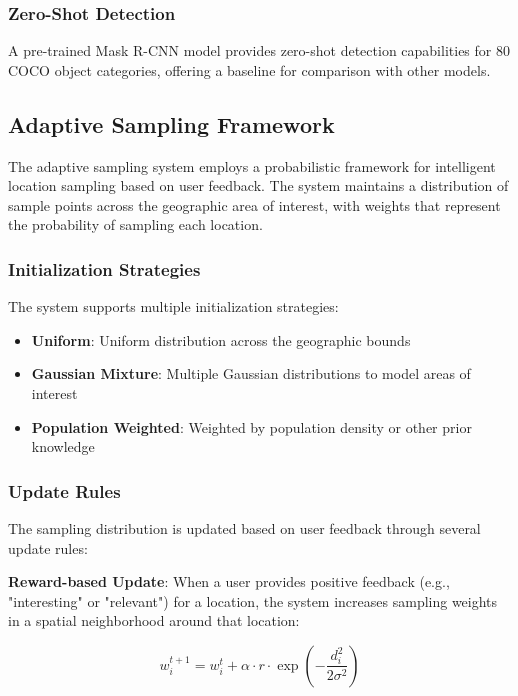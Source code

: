\documentclass[conference]{IEEEtran}
\begin{document}
\subsubsection{Zero-Shot Detection}
A pre-trained Mask R-CNN model provides zero-shot detection capabilities for 80 COCO object categories, offering a baseline for comparison with other models.

\subsection{Adaptive Sampling Framework}

The adaptive sampling system employs a probabilistic framework for intelligent location sampling based on user feedback. The system maintains a distribution of sample points across the geographic area of interest, with weights that represent the probability of sampling each location.

\subsubsection{Initialization Strategies}

The system supports multiple initialization strategies:
\begin{itemize}
    \item \textbf{Uniform}: Uniform distribution across the geographic bounds
    \item \textbf{Gaussian Mixture}: Multiple Gaussian distributions to model areas of interest
    \item \textbf{Population Weighted}: Weighted by population density or other prior knowledge
\end{itemize}

\subsubsection{Update Rules}

The sampling distribution is updated based on user feedback through several update rules:

\textbf{Reward-based Update}: When a user provides positive feedback (e.g., "interesting" or "relevant") for a location, the system increases sampling weights in a spatial neighborhood around that location:

\begin{equation}
w_i^{t+1} = w_i^t + \alpha \cdot r \cdot \exp\left(-\frac{d_i^2}{2\sigma^2}\right)
\end{equation}
\end{document}
